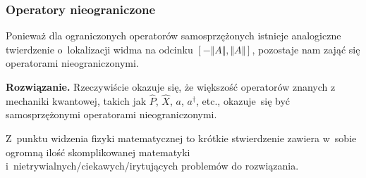 \documentclass[10pt,t]{beamer}
\begin{document}
\begin{frame}
  \frametitle{Operatory nieograniczone}


  Ponieważ dla ograniczonych operatorów samosprzężonych istnieje analogiczne
  twierdzenie o~lokalizacji widma na odcinku $[ -\Vert A \Vert, \Vert A \Vert ]$,
  pozostaje nam zająć się operatorami nieograniczonymi.

  \textbf{Rozwiązanie.}
  Rzeczywiście okazuje się, że większość operatorów znanych z mechaniki
  kwantowej, takich jak $\widehat{ P }$, $\widehat{ X }$, $a$, $a^{ \dagger }$,
  etc., okazuje~się być samosprzężonymi operatorami nieograniczonymi.

  Z~punktu widzenia fizyki matematycznej to krótkie stwierdzenie zawiera
  w~sobie ogromną ilość skomplikowanej matematyki
  i~nietrywialnych/ciekawych/irytujących problemów do rozwiązania.

\end{frame}










\end{document}
